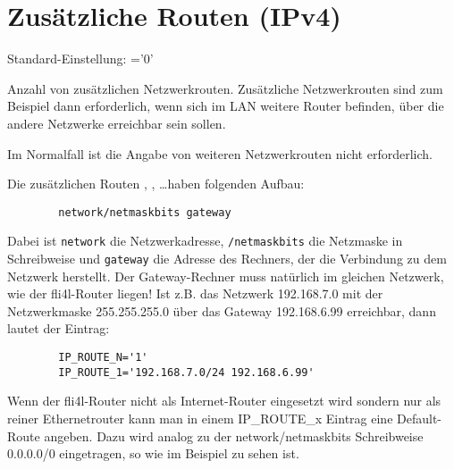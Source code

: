 \section{Zusätzliche Routen (IPv4)}

\begin{description}


    Standard-Einstellung: ='0'

    {Anzahl von zusätzlichen Netzwerkrouten. Zusätzliche Netzwerkrouten
    sind zum Beispiel dann erforderlich, wenn sich im LAN weitere
    Router befinden, über die andere Netzwerke erreichbar sein sollen.

    Im Normalfall ist die Angabe von weiteren Netzwerkrouten nicht
    erforderlich.
    }


  {Die zusätzlichen Routen , , \ldots haben folgenden
    Aufbau:

    \begin{example}
    \begin{verbatim}
        network/netmaskbits gateway
    \end{verbatim}
    \end{example}

    Dabei ist \texttt{network} die Netzwerkadresse, \texttt{/netmaskbits} die Netzmaske
    in  Schreibweise und \texttt{gateway} die Adresse des Rechners,
    der die Verbindung zu dem Netzwerk herstellt. Der Gateway-Rechner muss
    natürlich im gleichen Netzwerk, wie der fli4l-Router liegen!
    Ist z.B. das Netzwerk 192.168.7.0 mit der Netzwerkmaske
    255.255.255.0 über das Gateway 192.168.6.99 erreichbar, dann lautet der
    Eintrag:

    \begin{example}
    \begin{verbatim}
        IP_ROUTE_N='1'
        IP_ROUTE_1='192.168.7.0/24 192.168.6.99'
    \end{verbatim}
    \end{example}}

    Wenn der fli4l-Router nicht als Internet-Router eingesetzt wird
    sondern nur als reiner Ethernetrouter kann man in einem IP\_ROUTE\_x
    Eintrag eine Default-Route angeben. Dazu wird analog zu der
    network/netmaskbits Schreibweise 0.0.0.0/0 eingetragen, so
    wie im Beispiel zu sehen ist.


\end{description}
